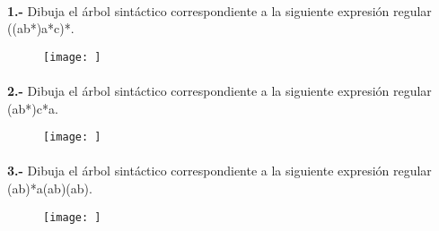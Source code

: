 \documentclass[11pt,a4paper]{report}
\begin{document}
\paragraph{}

\paragraph{}
\textbf{1.-} Dibuja el árbol sintáctico correspondiente a la siguiente expresión regular ((a\textbar b*)a*c)*. 
\begin{figure}[ht!]
\centering
\texttt{[image: ]}
\end{figure}\paragraph{}
\textbf{2.-} Dibuja el árbol sintáctico correspondiente a la siguiente expresión regular (a\textbar b*)c*a. 
\begin{figure}[ht!]
\centering
\texttt{[image: ]}
\end{figure}\paragraph{}
\textbf{3.-} Dibuja el árbol sintáctico correspondiente a la siguiente expresión regular (a\textbar b)*a(a\textbar b)(a\textbar b). 
\begin{figure}[ht!]
\centering
\texttt{[image: ]}
\end{figure}
\end{document}

